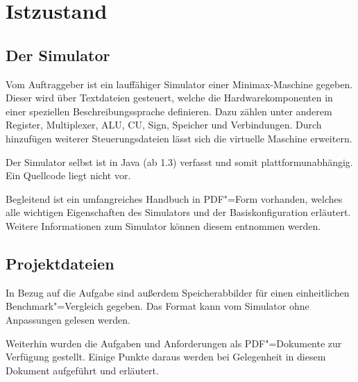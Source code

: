 \chapter{Istzustand}
\label{chapter:Pflichtenheft-Istzustand}

\section{Der Simulator}
\label{chapter:Pflichtenheft-Istzustand-Simulator}

Vom Auftraggeber ist ein lauffähiger Simulator einer Minimax-Maschine gegeben. Dieser wird über Textdateien gesteuert, welche die Hardwarekomponenten in einer speziellen Beschreibungssprache definieren. Dazu zählen unter anderem Register, Multiplexer, ALU, CU, Sign, Speicher und Verbindungen. Durch hinzufügen weiterer Steuerungsdateien lässt sich die virtuelle Maschine erweitern.

Der Simulator selbst ist in Java (ab 1.3) verfasst und somit plattformunabhängig. Ein Quellcode liegt nicht vor.

Begleitend ist ein umfangreiches Handbuch in PDF"=Form vorhanden, welches alle wichtigen Eigenschaften des Simulators und der Basiskonfiguration erläutert. Weitere Informationen zum Simulator können diesem entnommen werden.


\section{Projektdateien}
\label{chapter:Pflichtenheft-Istzustand-Projektdateien}

In Bezug auf die Aufgabe sind außerdem Speicherabbilder für einen einheitlichen Benchmark"=Vergleich gegeben. Das Format kann vom Simulator ohne Anpassungen gelesen werden.

Weiterhin wurden die Aufgaben und Anforderungen als PDF"=Dokumente zur Verfügung gestellt. Einige Punkte daraus werden bei Gelegenheit in diesem Dokument aufgeführt und erläutert.
